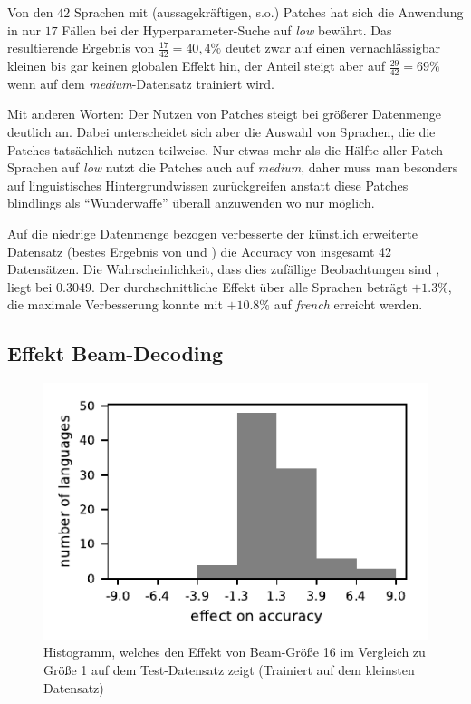 \documentclass[11pt,a4paper]{article}
\newcommand{\lang}[1]{\textit{#1}}
\begin{document}
Von den $42$ Sprachen mit (aussagekräftigen, s.o.) Patches hat sich die Anwendung in nur $17$ Fällen bei der Hyperparameter-Suche auf \textit{low} bewährt. Das resultierende Ergebnis von $\frac{17}{42} = 40,4\%$ deutet zwar auf einen vernachlässigbar kleinen bis gar keinen globalen Effekt hin, der Anteil steigt aber auf $\frac{29}{42} = 69\%$ wenn auf dem \textit{medium}-Datensatz trainiert wird.

Mit anderen Worten: Der Nutzen von Patches steigt bei größerer Datenmenge deutlich an. Dabei unterscheidet sich aber die Auswahl von Sprachen, die die Patches tatsächlich nutzen teilweise. Nur etwas mehr als die Hälfte aller Patch-Sprachen auf \textit{low} nutzt die Patches auch auf \textit{medium}, daher muss man besonders auf linguistisches Hintergrundwissen zurückgreifen anstatt diese Patches blindlings als \enquote{Wunderwaffe} überall anzuwenden wo nur möglich.

Auf die niedrige Datenmenge bezogen verbesserte der künstlich erweiterte Datensatz (bestes Ergebnis von  und ) die Accuracy von insgesamt 42 Datensätzen. Die Wahrscheinlichkeit, dass dies zufällige Beobachtungen sind \citep{biostat:zar}, liegt bei $0.3049$. Der durchschnittliche Effekt über alle Sprachen beträgt $+1.3\%$, die maximale Verbesserung konnte mit $+10.8\%$ auf \lang{french} erreicht werden.

\subsection{Effekt Beam-Decoding}
\label{sec:beam-results}

\begin{figure}
\centering
\includegraphics[width=\linewidth]{beamlow}
\caption{Histogramm, welches den Effekt von Beam-Größe 16 im Vergleich zu Größe 1 auf dem Test-Datensatz zeigt (Trainiert auf dem kleinsten Datensatz)}
\label{fig:histBeamLowAcc}
\end{figure}
\end{document}
